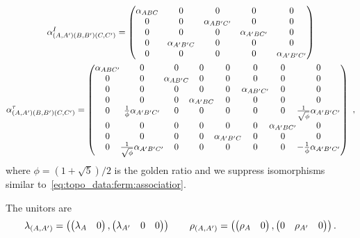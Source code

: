\begin{gather}
\begin{gathered}
    \alpha^I_{\fermpair{A}{A'}\fermpair{B}{B'}\fermpair{C}{C'}}
    =
    \begin{pmatrix}
        \alpha_{ABC} & 0 & 0 & 0 & 0 \\
        0 & 0 & \alpha_{AB'C'} & 0 & 0 \\
        0 & 0 & 0 & \alpha_{A'BC'} & 0 \\
        0 & \alpha_{A'B'C} & 0 & 0 & 0 \\
        0 & 0 & 0 & 0 & \alpha_{A'B'C'}
    \end{pmatrix}
    \\
    \setlength{\arraycolsep}{0pt}
    \alpha^\tau_{\fermpair{A}{A'}\fermpair{B}{B'}\fermpair{C}{C'}}
    =
    \begin{pmatrix}
        \alpha_{ABC'} & 0 & 0 & 0 & 0 & 0 & 0 & 0 \\
        0 & 0 & \alpha_{AB'C} & 0 & 0 & 0 & 0 & 0 \\
        0 & 0 & 0 & 0 & 0 & \alpha_{AB'C'} & 0 & 0 \\
        0 & 0 & 0 & \alpha_{A'BC} & 0 & 0 & 0 & 0 \\
        0 & \tfrac{1}{\phi} \alpha_{A'B'C'} & 0 & 0 & 0 & 0 & 0 & \tfrac{1}{\sqrt{\phi}} \alpha_{A'B'C'} \\
        0 & 0 & 0 & 0 & 0 & 0 & \alpha_{A'BC'} & 0 \\
        0 & 0 & 0 & 0 & \alpha_{A'B'C} & 0 & 0 & 0 \\
        0 & \tfrac{1}{\sqrt{\phi}} \alpha_{A'B'C'} & 0 & 0 & 0 & 0 & 0 & -\tfrac{1}{\phi} \alpha_{A'B'C'} \\
    \end{pmatrix}
    ~,
\end{gathered}
\end{gather}
where $\phi = (1 + \sqrt{5}) / 2$ is the golden ratio and we suppress isomorphisms similar to~\eqref{eq:topo_data:ferm:associatior}.

The unitors are
\begin{equation}
    \lambda_{\fermpair{A}{A'}}
    = \fermpair{
        \begin{pmatrix} \lambda_A & 0 \end{pmatrix}
    }{
        \begin{pmatrix} \lambda_{A'} & 0 & 0 \end{pmatrix}
    }
    \qquad
    \rho_{\fermpair{A}{A'}}
    = \fermpair{
        \begin{pmatrix} \rho_A & 0 \end{pmatrix}
    }{
        \begin{pmatrix} 0 & \rho_{A'} & 0\end{pmatrix}
    }
    .
\end{equation}

